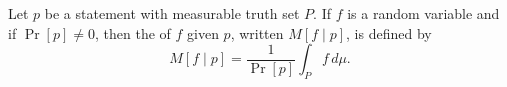Let $p$ be a statement with measurable truth set $P$. If $f$ is a random variable and if $\Pr[p] \neq 0$, then the  of $f$ given $p$, written $M[f \mid p]$, is defined by
$$M[f \mid p] = \frac{1}{\Pr[p]} \int_{P} f \, d\mu.$$
